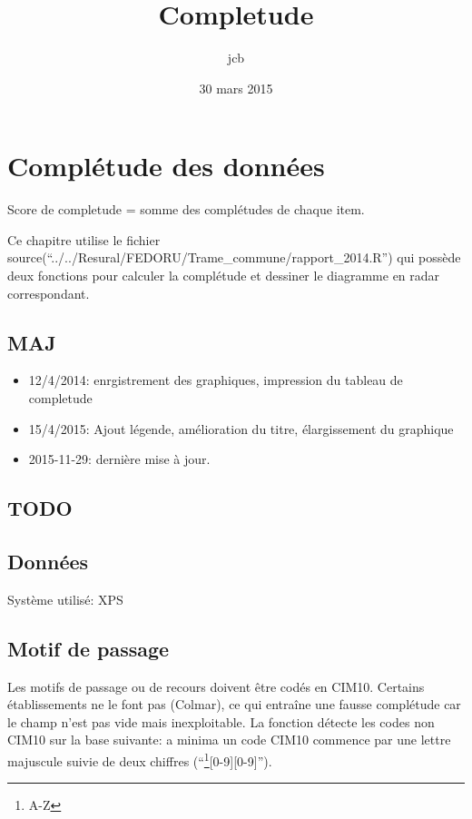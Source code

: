 \documentclass[]{article}
\title{Completude}
\author{jcb}
\date{30 mars 2015}
\let\rmarkdownfootnote\footnote%
\def\footnote{\protect\rmarkdownfootnote}
\begin{document}
\maketitle


{
\hypersetup{linkcolor=black}
\setcounter{tocdepth}{2}
\tableofcontents
}
\section{Complétude des données}\label{completude-des-donnees}

Score de completude = somme des complétudes de chaque item.

Ce chapitre utilise le fichier
source(``../../Resural/FEDORU/Trame\_commune/rapport\_2014.R'') qui
possède deux fonctions pour calculer la complétude et dessiner le
diagramme en radar correspondant.

\subsection{MAJ}\label{maj}

\begin{itemize}
\itemsep1pt\parskip0pt
\item
  12/4/2014: enrgistrement des graphiques, impression du tableau de
  completude
\item
  15/4/2015: Ajout légende, amélioration du titre, élargissement du
  graphique
\item
  2015-11-29: dernière mise à jour.
\end{itemize}

\subsection{TODO}\label{todo}

\subsection{Données}\label{donnees}

Système utilisé: XPS

\subsection{Motif de passage}\label{motif-de-passage}

Les motifs de passage ou de recours doivent être codés en CIM10.
Certains établissements ne le font pas (Colmar), ce qui entraîne une
fausse complétude car le champ n'est pas vide mais inexploitable. La
fonction détecte les codes non CIM10 sur la base suivante: a minima un
code CIM10 commence par une lettre majuscule suivie de deux chiffres
(``\footnote{A-Z}{[}0-9{]}{[}0-9{]}'').
\end{document}

